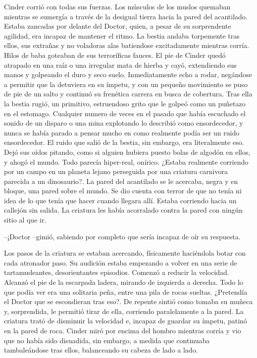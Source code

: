 Cinder corrió con todas sus fuerzas. Los músculos de los muslos quemaban mientras se sumergía a través de la desigual tierra hacia la pared del acantilado. Estaba zancadas por delante del Doctor, quien, a pesar de su sorprendente agilidad, era incapaz de mantener el ritmo.
La bestia andaba torpemente tras ellos, sus extrañas y no voladoras alas batiendose excitadamente mientras corría. Hilos de baba goteaban de sus terroríficas fauces.
El pie de Cinder quedó atrapado en una raíz o una irregular mata de hierba y cayó, extendiendo sus manos y golpeando el duro y seco suelo. Inmediatamente echo a rodar, negándose a permitir que la detuviera en su ímpetu, y con un pequeño movimiento se puso de pie de un salto y continuó su frenética carrera en busca de cobertura.
Tras ella la bestia rugió, un primitivo, estruendoso grito que le golpeó como un puñetazo en el estomago. Cualquier numero de veces en el pasado que había escuchado el sonido de un disparo o una mina explotando lo describió como ensordecedor, y nunca se había parado a pensar mucho en como realmente podía ser un ruido ensordecedor. El ruido que salió de la bestia, sin embargo, era literalmente eso. Dejó sus oídos pitando, como si alguien hubiera puesto bolas de algodón en ellos, y ahogó el mundo.
Todo parecía hiper-real, onírico. ¿Estaba realmente corriendo por un campo en un planeta lejano perseguida por una criatura carnivora parecida a un dinosaurio?.
La pared del acantilado se le acercaba, negra y en bloque, una pared sobre el mundo. Se dio cuenta con terror de que no tenía ni idea de lo que tenía que hacer cuando llegara allí. Estaba corriendo hacia un callejón sin salida. La criatura les había acorralado contra la pared con ningún sitio al que ir.

--¡Doctor --gimió, sabiendo por completo que sería incapaz de oír su respuesta.

Los pasos de la criatura se estaban acercando, físicamente haciéndola botar con cada atronador paso. Su audición estaba empezando a volver en una serie de tartamudeantes, desorientantes episodios. Comenzó a reducir la velocidad.
Alcanzó el pie de la escarpada ladera, mirando de izquierda a derecha. Todo lo que podía ver era una solitaria peña, entre una pila de rocas sueltas. ¿Pretendía el Doctor que se escondieran tras eso?.
De repente sintió como tomaba su muñeca y, sorprendida, le permitió tirar de ella, corriendo paralelamente a la pared. La criatura trató de disminuir la velocidad e, incapaz de guardar su ímpetu, patinó en la pared de roca.
Cinder miró por encima del hombro mientras corría y vio que no había sido disuadida, sin embargo, a medida que continuaba tambaleándose tras ellos, balanceando su cabeza de lado a lado.

